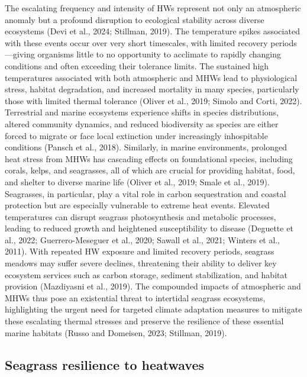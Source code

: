 \documentclass[
  letterpaper,
  11pt,
  english,
  singlespacing,
  headsepline]{MastersDoctoralThesis}
\begin{document}
\begin{spacing}{1.5}
The escalating frequency and intensity of HWs represent not only an
atmospheric anomaly but a profound disruption to ecological stability
across diverse ecosystems (Devi et al., 2024; Stillman, 2019). The
temperature spikes associated with these events occur over very short
timescales, with limited recovery periods---giving organisms little to
no opportunity to acclimate to rapidly changing conditions and often
exceeding their tolerance limits. The sustained high temperatures
associated with both atmospheric and MHWs lead to physiological stress,
habitat degradation, and increased mortality in many species,
particularly those with limited thermal tolerance (Oliver et al., 2019;
Simolo and Corti, 2022). Terrestrial and marine ecosystems experience
shifts in species distributions, altered community dynamics, and reduced
biodiversity as species are either forced to migrate or face local
extinction under increasingly inhospitable conditions (Pansch et al.,
2018). Similarly, in marine environments, prolonged heat stress from
MHWs has cascading effects on foundational species, including corals,
kelps, and seagrasses, all of which are crucial for providing habitat,
food, and shelter to diverse marine life (Oliver et al., 2019; Smale et
al., 2019). Seagrasses, in particular, play a vital role in carbon
sequestration and coastal protection but are especially vulnerable to
extreme heat events. Elevated temperatures can disrupt seagrass
photosynthesis and metabolic processes, leading to reduced growth and
heightened susceptibility to disease (Deguette et al., 2022;
Guerrero-Meseguer et al., 2020; Sawall et al., 2021; Winters et al.,
2011). With repeated HW exposure and limited recovery periods, seagrass
meadows may suffer severe declines, threatening their ability to deliver
key ecosystem services such as carbon storage, sediment stabilization,
and habitat provision (Mazdiyasni et al., 2019). The compounded impacts
of atmospheric and MHWs thus pose an existential threat to intertidal
seagrass ecosystems, highlighting the urgent need for targeted climate
adaptation measures to mitigate these escalating thermal stresses and
preserve the resilience of these essential marine habitats (Russo and
Domeisen, 2023; Stillman, 2019).

\subsection{Seagrass resilience to
heatwaves}\label{seagrass-resilience-to-heatwaves}


\end{spacing}
\end{document}
